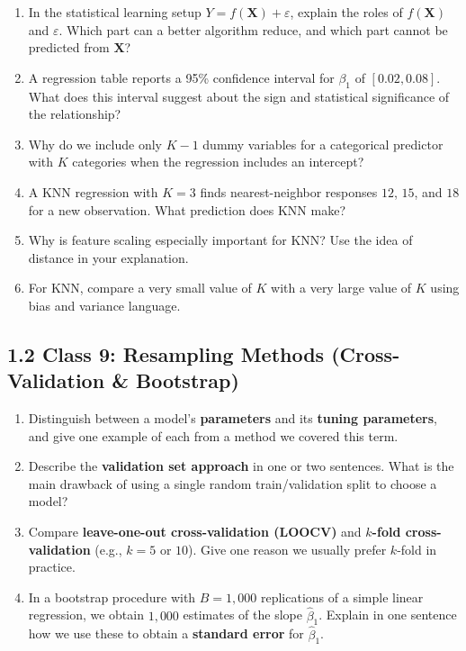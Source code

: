 \documentclass[11pt]{article}
\begin{document}
\begin{enumerate}[leftmargin=*]
\item In the statistical learning setup $Y=f(\mathbf{X})+\varepsilon$, explain the roles of $f(\mathbf{X})$ and $\varepsilon$. Which part can a better algorithm reduce, and which part cannot be predicted from $\mathbf{X}$?

\item A regression table reports a 95\% confidence interval for $\beta_1$ of $[0.02,0.08]$. What does this interval suggest about the sign and statistical significance of the relationship?

\item Why do we include only $K-1$ dummy variables for a categorical predictor with $K$ categories when the regression includes an intercept?

\item A KNN regression with $K=3$ finds nearest-neighbor responses $12$, $15$, and $18$ for a new observation. What prediction does KNN make?

\item Why is feature scaling especially important for KNN? Use the idea of distance in your explanation.

\item For KNN, compare a very small value of $K$ with a very large value of $K$ using bias and variance language.

\end{enumerate}


\subsection*{1.2 Class 9: Resampling Methods (Cross-Validation \& Bootstrap)}

\begin{enumerate}[leftmargin=*, resume]

\item Distinguish between a model's \textbf{parameters} and its \textbf{tuning parameters}, and give one example of each from a method we covered this term.

\item Describe the \textbf{validation set approach} in one or two sentences. What is the main drawback of using a single random train/validation split to choose a model?

\item Compare \textbf{leave-one-out cross-validation (LOOCV)} and \textbf{$k$-fold cross-validation} (e.g., $k=5$ or $10$). Give one reason we usually prefer $k$-fold in practice.

\item In a bootstrap procedure with $B=1{,}000$ replications of a simple linear regression, we obtain $1{,}000$ estimates of the slope $\hat{\beta}_1$. Explain in one sentence how we use these to obtain a \textbf{standard error} for $\hat{\beta}_1$.

\end{enumerate}
\end{document}
